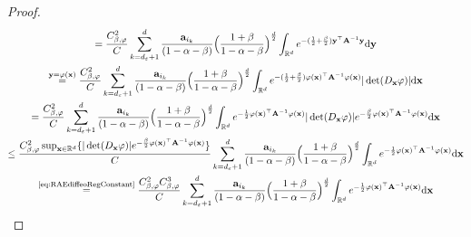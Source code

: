 \begin{proof}
\begin{multline}
        = \frac{\RAEdiffeoRegConstant}{\RAEnormalizationConstant} \sum_{\sumIndC=\dimInd_\RAErelerror+1}^{\dimInd} \frac{\spdMatrixDiag_{\sumIndA_\sumIndC}}{(1 - \RAEboundParamB - \RAEboundParam)} \Bigl(\frac{1 + \RAEboundParam}{1 - \RAEboundParamB - \RAEboundParam} \Bigr)^{\frac{\dimInd}{2}}\int_{\Real^\dimInd} e^{-(\frac{1}{2} + \frac{\RAEboundParam}{2}) \VectorB^\top \spdMatrix^{-1} \VectorB} \mathrm{d} \VectorB\\
        \overset{\VectorB = \diffeo(\Vector)}{=} \frac{\RAEdiffeoRegConstant}{\RAEnormalizationConstant} \sum_{\sumIndC=\dimInd_\RAErelerror+1}^{\dimInd} \frac{\spdMatrixDiag_{\sumIndA_\sumIndC}}{(1 - \RAEboundParamB - \RAEboundParam)} \Bigl(\frac{1 + \RAEboundParam}{1 - \RAEboundParamB - \RAEboundParam} \Bigr)^{\frac{\dimInd}{2}} \int_{\Real^\dimInd} e^{-(\frac{1}{2} + \frac{\RAEboundParam}{2}) \diffeo(\Vector)^\top \spdMatrix^{-1} \diffeo(\Vector)} |\det(D_{\Vector} \diffeo)|\mathrm{d} \Vector \\
        = \frac{\RAEdiffeoRegConstant}{\RAEnormalizationConstant} \sum_{\sumIndC=\dimInd_\RAErelerror+1}^{\dimInd} \frac{\spdMatrixDiag_{\sumIndA_\sumIndC}}{(1 - \RAEboundParamB - \RAEboundParam)} \Bigl(\frac{1 + \RAEboundParam}{1 - \RAEboundParamB - \RAEboundParam} \Bigr)^{\frac{\dimInd}{2}}\int_{\Real^\dimInd} e^{-\frac{1}{2} \diffeo(\Vector)^\top \spdMatrix^{-1} \diffeo(\Vector)} |\det(D_{\Vector} \diffeo)| e^{-\frac{\RAEboundParam}{2} \diffeo(\Vector)^\top \spdMatrix^{-1} \diffeo(\Vector)}\mathrm{d} \Vector \\
        \leq \frac{\RAEdiffeoRegConstant \sup_{\Vector \in \Real^{\dimInd}} \{|\det(D_{\Vector} \diffeo)| e^{-\frac{\RAEboundParam}{2} \diffeo(\Vector)^\top \spdMatrix^{-1} \diffeo(\Vector)} \} }{\RAEnormalizationConstant} \sum_{\sumIndC=\dimInd_\RAErelerror+1}^{\dimInd} \frac{\spdMatrixDiag_{\sumIndA_\sumIndC}}{(1 - \RAEboundParamB - \RAEboundParam)} \Bigl(\frac{1 + \RAEboundParam}{1 - \RAEboundParamB - \RAEboundParam} \Bigr)^{\frac{\dimInd}{2}} \int_{\Real^\dimInd} e^{-\frac{1}{2} \diffeo(\Vector)^\top \spdMatrix^{-1} \diffeo(\Vector)} \mathrm{d} \Vector\\
        \overset{\text{\ref{eq:RAEdiffeoRegConstant}}}{=} \frac{\RAEdiffeoRegConstant \RAEinvdiffeoRegConstant }{\RAEnormalizationConstant} \sum_{\sumIndC=\dimInd_\RAErelerror+1}^{\dimInd} \frac{\spdMatrixDiag_{\sumIndA_\sumIndC}}{(1 - \RAEboundParamB - \RAEboundParam)} \Bigl(\frac{1 + \RAEboundParam}{1 - \RAEboundParamB - \RAEboundParam} \Bigr)^{\frac{\dimInd}{2}} \int_{\Real^\dimInd} e^{-\frac{1}{2} \diffeo(\Vector)^\top \spdMatrix^{-1} \diffeo(\Vector)} \mathrm{d} \Vector \\

\end{multline}
\end{proof}
